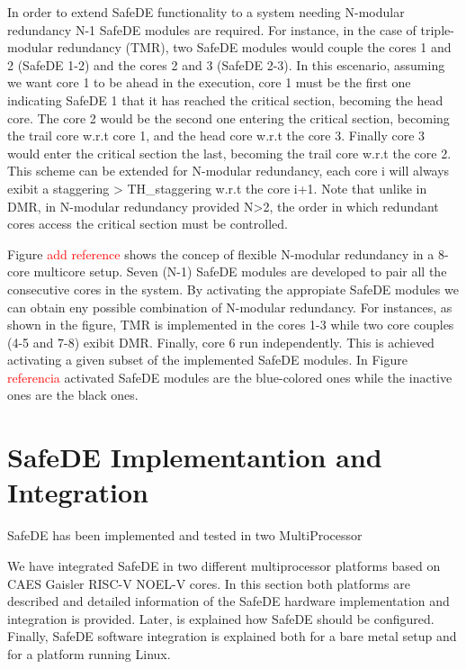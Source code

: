 In order to extend SafeDE functionality to a system needing N-modular redundancy N-1 SafeDE modules are required. For instance, in the case of triple-modular redundancy (TMR), two SafeDE modules would couple the cores 1 and 2 (SafeDE 1-2) and the cores 2 and 3 (SafeDE 2-3). In this escenario, assuming we want core 1 to be ahead in the execution, core 1 must be the first one indicating SafeDE 1 that it has reached the critical section, becoming the head core. The core 2 would be the second one entering the critical section, becoming the trail core w.r.t core 1, and the head core w.r.t the core 3. Finally core 3 would enter the critical section the last, becoming the trail core w.r.t the core 2. This scheme can be extended for  N-modular redundancy, each core i will always exibit a staggering > TH\_staggering w.r.t the core i+1. Note that unlike in DMR, in N-modular redundancy provided N>2, the order in which redundant cores access the critical section must be controlled.  

Figure \textcolor{red}{add reference} shows the concep of flexible N-modular redundancy in a 8-core multicore setup. Seven (N-1) SafeDE modules are developed to pair all the consecutive cores in the system. By activating the appropiate SafeDE modules we can obtain eny possible combination of N-modular redundancy. For instances, as shown in the figure, TMR is implemented in the cores 1-3 while two core couples (4-5 and 7-8) exibit DMR. Finally, core 6 run independently. This is achieved activating a given subset of the implemented SafeDE modules. In Figure \textcolor{red}{referencia} activated SafeDE modules are the blue-colored ones while the inactive ones are the black ones.





\section{SafeDE Implementantion and Integration}

SafeDE has been implemented and tested in two MultiProcessor 

We have integrated SafeDE in two different multiprocessor platforms based on CAES Gaisler RISC-V NOEL-V cores. In this section both platforms are described and detailed information of the SafeDE hardware implementation and integration is provided. Later, is explained how SafeDE should be configured. Finally, SafeDE software integration is explained both for a bare metal setup and for a platform running Linux.    

